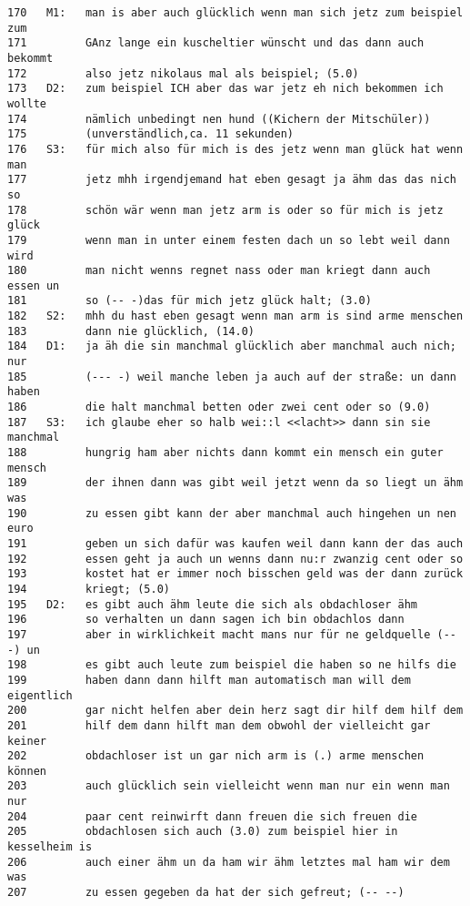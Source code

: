 \begin{lstlisting}[language={}]
170   M1:   man is aber auch glücklich wenn man sich jetz zum beispiel zum 
171         GAnz lange ein kuscheltier wünscht und das dann auch bekommt 
172         also jetz nikolaus mal als beispiel; (5.0)
173   D2:   zum beispiel ICH aber das war jetz eh nich bekommen ich wollte  
174         nämlich unbedingt nen hund ((Kichern der Mitschüler)) 
175         (unverständlich,ca. 11 sekunden)
176   S3:   für mich also für mich is des jetz wenn man glück hat wenn man  
177         jetz mhh irgendjemand hat eben gesagt ja ähm das das nich so 
178         schön wär wenn man jetz arm is oder so für mich is jetz glück 
179         wenn man in unter einem festen dach un so lebt weil dann wird 
180         man nicht wenns regnet nass oder man kriegt dann auch essen un 
181         so (-- -)das für mich jetz glück halt; (3.0)
182   S2:   mhh du hast eben gesagt wenn man arm is sind arme menschen 
183         dann nie glücklich, (14.0)
184   D1:   ja äh die sin manchmal glücklich aber manchmal auch nich;  nur 
185         (--- -) weil manche leben ja auch auf der straße: un dann haben 
186         die halt manchmal betten oder zwei cent oder so (9.0)
187   S3:   ich glaube eher so halb wei::l <<lacht>> dann sin sie manchmal 
188         hungrig ham aber nichts dann kommt ein mensch ein guter mensch 
189         der ihnen dann was gibt weil jetzt wenn da so liegt un ähm was 
190         zu essen gibt kann der aber manchmal auch hingehen un nen euro 
191         geben un sich dafür was kaufen weil dann kann der das auch 
192         essen geht ja auch un wenns dann nu:r zwanzig cent oder so  
193         kostet hat er immer noch bisschen geld was der dann zurück  
194         kriegt; (5.0)
195   D2:   es gibt auch ähm leute die sich als obdachloser ähm 
196         so verhalten un dann sagen ich bin obdachlos dann
197         aber in wirklichkeit macht mans nur für ne geldquelle (-- -) un 
198         es gibt auch leute zum beispiel die haben so ne hilfs die 
199         haben dann dann hilft man automatisch man will dem eigentlich 
200         gar nicht helfen aber dein herz sagt dir hilf dem hilf dem 
201         hilf dem dann hilft man dem obwohl der vielleicht gar keiner 
202         obdachloser ist un gar nich arm is (.) arme menschen können 
203         auch glücklich sein vielleicht wenn man nur ein wenn man nur 
204         paar cent reinwirft dann freuen die sich freuen die 
205         obdachlosen sich auch (3.0) zum beispiel hier in kesselheim is 
206         auch einer ähm un da ham wir ähm letztes mal ham wir dem was 
207         zu essen gegeben da hat der sich gefreut; (-- --)

\end{lstlisting}

